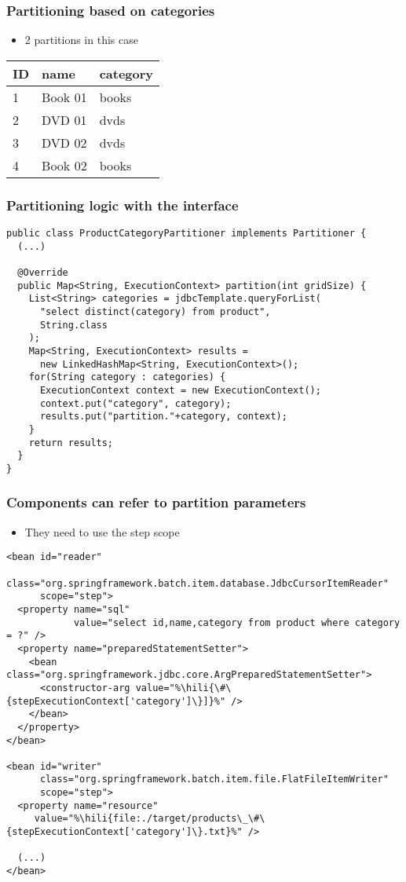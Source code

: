 \begin{frame}
 \frametitle{Partitioning based on categories}
 \begin{itemize}
  \item 2 partitions in this case  
 \end{itemize}
 \begin{center}
 \begin{tabular}{l|l|l}
  \hline
  ID & name & category \\
  \hline
  \rowcolor{cyan}1 & Book 01 & books \\
  \rowcolor{yellow}2 & DVD 01 & dvds \\
  \rowcolor{yellow}3 & DVD 02 & dvds \\
  \rowcolor{cyan}4 & Book 02 & books \\
  \hline
 \end{tabular}
 \end{center}
\end{frame}


\begin{frame}[fragile]
\frametitle{Partitioning logic with the  interface}
\lstset{language=Java}
\begin{lstlisting}
public class ProductCategoryPartitioner implements Partitioner {
  (...)

  @Override
  public Map<String, ExecutionContext> partition(int gridSize) {
    List<String> categories = jdbcTemplate.queryForList(
      "select distinct(category) from product",
      String.class
    );
    Map<String, ExecutionContext> results = 
      new LinkedHashMap<String, ExecutionContext>();
    for(String category : categories) {
      ExecutionContext context = new ExecutionContext();
      context.put("category", category);
      results.put("partition."+category, context);
    } 
    return results;
  }
}
\end{lstlisting}
\end{frame}

\begin{frame}[fragile]
\frametitle{Components can refer to partition parameters}
\begin{itemize}
 \item They need to use the step scope 
\end{itemize}

\lstset{language=Java}
\begin{lstlisting}
<bean id="reader" 
      class="org.springframework.batch.item.database.JdbcCursorItemReader" 
      scope="step">
  <property name="sql" 
            value="select id,name,category from product where category = ?" />
  <property name="preparedStatementSetter">
    <bean class="org.springframework.jdbc.core.ArgPreparedStatementSetter">
      <constructor-arg value="%\hili{\#\{stepExecutionContext['category']\}]}%" />
    </bean>
  </property>
</bean>

<bean id="writer" 
      class="org.springframework.batch.item.file.FlatFileItemWriter" 
      scope="step">
  <property name="resource"
     value="%\hili{file:./target/products\_\#\{stepExecutionContext['category']\}.txt}%" />
 
  (...)
</bean>
\end{lstlisting}
\end{frame}

